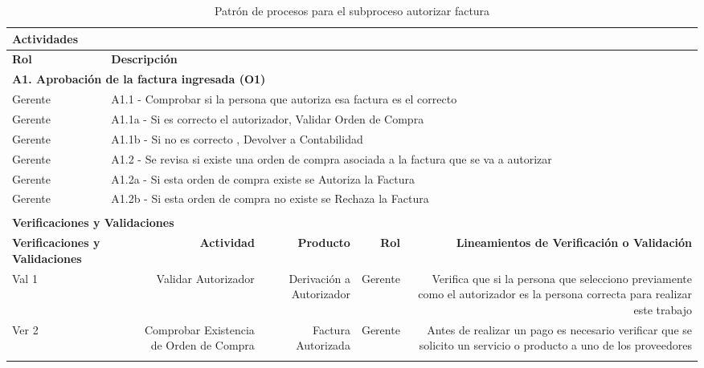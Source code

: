 \begin{longtable}{|llrrrrrr|}
	
	\multicolumn{8}{|l|}{\textbf{Actividades}} \\ \hline
    \textbf{Rol} & \multicolumn{7}{|l|}{\textbf{Descripción}} \\ \hline 
    \multicolumn{8}{|l|}{\textbf{A1. Aprobación de la factura ingresada (O1) }} \\ \hline
     Gerente & \multicolumn{7}{|m{12cm}|}{A1.1 -  Comprobar si la persona que autoriza esa factura es el correcto} \\ \hline
     Gerente & \multicolumn{7}{|m{12cm}|}{A1.1a - Si es correcto el autorizador, Validar Orden de Compra } \\ \hline
     Gerente & \multicolumn{7}{|m{12cm}|}{A1.1b - Si no es correcto , Devolver a Contabilidad} \\ \hline
     Gerente & \multicolumn{7}{|m{12cm}|}{A1.2 - Se revisa si existe una orden de compra asociada a la factura que se va a autorizar} \\ \hline
     Gerente & \multicolumn{7}{|m{12cm}|}{A1.2a - Si esta orden de compra existe se Autoriza la Factura } \\ \hline
     Gerente & \multicolumn{7}{|m{12cm}|}{A1.2b - Si esta orden de compra no existe se Rechaza la Factura } \\ \hline
    
     & & & & & & & \\ \hline
	\multicolumn{8}{|l|}{\textbf{Verificaciones y Validaciones}} \\ \hline
	\multicolumn{2}{|m{3cm}|}{\textbf{Verificaciones y Validaciones}} & \multicolumn{1}{m{2cm}|}{\textbf{Actividad}} & \multicolumn{1}{m{2,2cm}|}{\textbf{Producto}} & \multicolumn{1}{m{1.5cm}|}{\textbf{Rol}} &\multicolumn{3}{m{4cm}|}{\textbf{Lineamientos de Verificación o Validación}} \\ \hline
	
	\multicolumn{2}{|m{3cm}|}{Val 1} & \multicolumn{1}{m{2cm}|}{Validar Autorizador} & \multicolumn{1}{m{2.2cm}|}{Derivación a Autorizador} & \multicolumn{1}{m{2cm}|}{Gerente} & \multicolumn{3}{m{4cm}|}{Verifica que si la persona que selecciono previamente como el autorizador es la persona correcta para realizar este trabajo} \\ \hline
		
	\multicolumn{2}{|m{3cm}|}{Ver 2} & \multicolumn{1}{m{2cm}|}{Comprobar Existencia de Orden de Compra} & \multicolumn{1}{m{2.2cm}|}{Factura Autorizada} & \multicolumn{1}{m{2cm}|}{Gerente} & \multicolumn{3}{m{4cm}|}{Antes de realizar un pago es necesario verificar que se solicito un servicio o producto a uno de los proveedores} \\ \hline
    \caption{Patrón de procesos para el subproceso autorizar factura}
\end{longtable}
